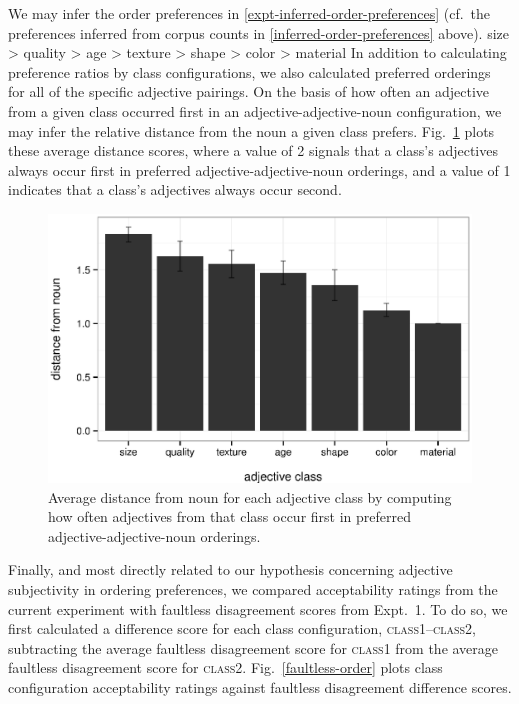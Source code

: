 \documentclass{pnastwo}
\begin{document}
\begin{article}
We may infer the order preferences in \ref{expt-inferred-order-preferences} (cf.\ the preferences inferred from corpus counts in \ref{inferred-order-preferences} above).
\be
size > quality > age > texture > shape > color > material\label{expt-inferred-order-preferences}\ee 
In addition to calculating preference ratios by class configurations, we also calculated preferred orderings for all of the specific adjective pairings. On the basis of how often an adjective from a given class occurred first in an adjective-adjective-noun configuration, we may infer the relative distance from the noun a given class prefers. Fig.\ \ref{class-distance-by-adj} plots these average distance scores, where a value of 2 signals that a class's adjectives always occur first in preferred adjective-adjective-noun orderings, and a value of 1 indicates that a class's adjectives always occur second.

\begin{figure}[h]
	\centering
	\includegraphics[width=.95\linewidth]{plots/class_distance_by_adj.eps}
	\caption{Average distance from noun for each adjective class by computing how often adjectives from that class occur first in preferred adjective-adjective-noun orderings.}\label{class-distance-by-adj}
\end{figure}

Finally, and most directly related to our hypothesis concerning adjective subjectivity in ordering preferences, we compared acceptability ratings from the current experiment with faultless disagreement scores from Expt.\ 1. To do so, we first calculated a difference score for each class configuration, \textsc{class1}--\textsc{class2}, subtracting the average faultless disagreement score for \textsc{class1} from the average faultless disagreement score for \textsc{class2}. Fig.\ \ref{faultless-order} plots class configuration acceptability ratings against faultless disagreement difference scores.


\end{article}
\end{document}
